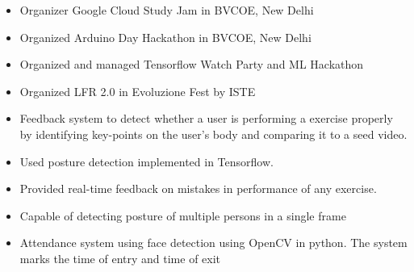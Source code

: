 
\begin{itemize}
    \item Organizer Google Cloud Study Jam in BVCOE, New Delhi
    \item Organized Arduino Day Hackathon in BVCOE, New Delhi
    \item Organized and managed Tensorflow Watch Party and ML Hackathon
    \item Organized LFR 2.0 in Evoluzione Fest by ISTE
\end{itemize}








\begin{itemize}
\item Feedback system to detect whether a user is performing a exercise properly by identifying key-points on the user's body and comparing it to a seed video.
\item Used posture detection implemented in \newline Tensorflow.
\item Provided real-time feedback on mistakes in performance of any exercise. 
\item Capable of detecting posture of multiple \newline persons in a single frame
\end{itemize}

\smallskip

\begin{itemize}
\item Attendance system using face detection using OpenCV in python. The system marks the time of entry and time of exit 
\end{itemize}
\smallskip

